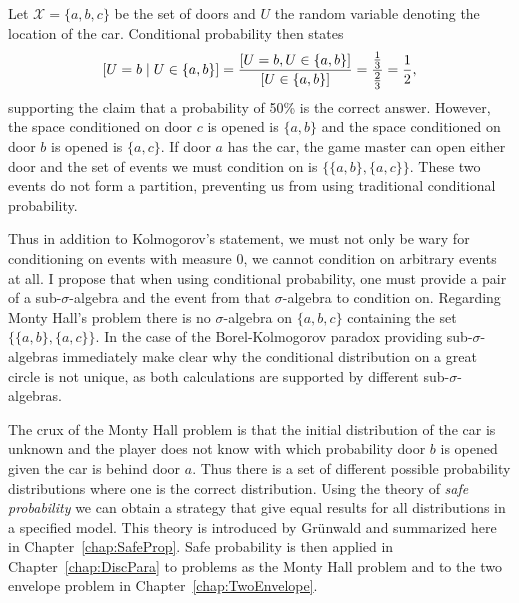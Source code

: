 \documentclass[a4paper]{report}
\theoremstyle{plain}
\theoremstyle{definition}
\theoremstyle{remark}
\numberwithin{equation}{chapter}
\let\P\relax
\DeclareMathOperator{\P}{\mathbb{P}}
\DeclareMathOperator{\1}{\mathbbm{1}}
\newcommand{\X}{\mathcal{X}}
\begin{document}
Let $\X=\{a,b,c\}$ be the set of doors and $U$ the random variable denoting the location of the car. Conditional probability then states
\begin{equation*}\label{eq:IntMonty}
\P[U=b\mid U\in\{a,b\}]=\frac{\P[U=b,U\in\{a,b\}]}{\P[U\in\{a,b\}]}=\frac{\frac{1}{3}}{\frac{2}{3}}=\frac{1}{2},
\end{equation*}
supporting the claim that a probability of 50\% is the correct answer. However, the space conditioned on door $c$ is opened is $\{a,b\}$ and the space conditioned on door $b$ is opened is $\{a,c\}$. If door $a$ has the car, the game master can open either door and the set of events we must condition on is $\{\{a,b\},\{a,c\}\}$. These two events do not form a partition, preventing us from using traditional conditional probability.

Thus in addition to Kolmogorov's statement, we must not only be wary for conditioning on events with measure 0, we cannot condition on arbitrary events at all. I propose that when using conditional probability, one must provide a pair of a sub-$\sigma$-algebra and the event from that $\sigma$-algebra to condition on. Regarding Monty Hall's problem there is no $\sigma$-algebra on $\{a,b,c\}$ containing the set $\{\{a,b\},\{a,c\}\}$. In the case of the Borel-Kolmogorov paradox providing sub-$\sigma$-algebras immediately make clear why the conditional distribution on a great circle is not unique, as both calculations are supported by different sub-$\sigma$-algebras.

The crux of the Monty Hall problem is that the initial distribution of the car is unknown and the player does not know with which probability door $b$ is opened given the car is behind door $a$. Thus there is a set of different possible probability distributions where one is the correct distribution. Using the theory of \emph{safe probability} we can obtain a strategy that give equal results for all distributions in a specified model. This theory is introduced by Grünwald \cite{Grunwald18} and summarized here in Chapter~\ref{chap:SafeProp}. Safe probability is then applied in Chapter~\ref{chap:DiscPara} to problems as the Monty Hall problem and to the two envelope problem in Chapter~\ref{chap:TwoEnvelope}.
\end{document}
